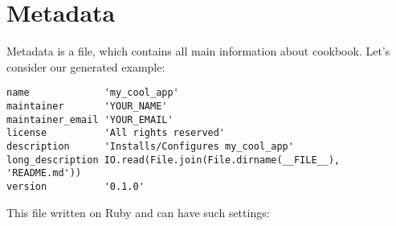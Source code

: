 \section{Metadata}
\label{sec:cookbook-metadata}

Metadata is a file, which contains all main information about cookbook. Let's consider our generated example:

\begin{lstlisting}[label=lst:cookbook-metadata1,title=my-server-cloud/site-cookbooks/my\_cool\_app/metadata.rb]
name             'my_cool_app'
maintainer       'YOUR_NAME'
maintainer_email 'YOUR_EMAIL'
license          'All rights reserved'
description      'Installs/Configures my_cool_app'
long_description IO.read(File.join(File.dirname(__FILE__), 'README.md'))
version          '0.1.0'
\end{lstlisting}

This file written on Ruby and can have such settings:

